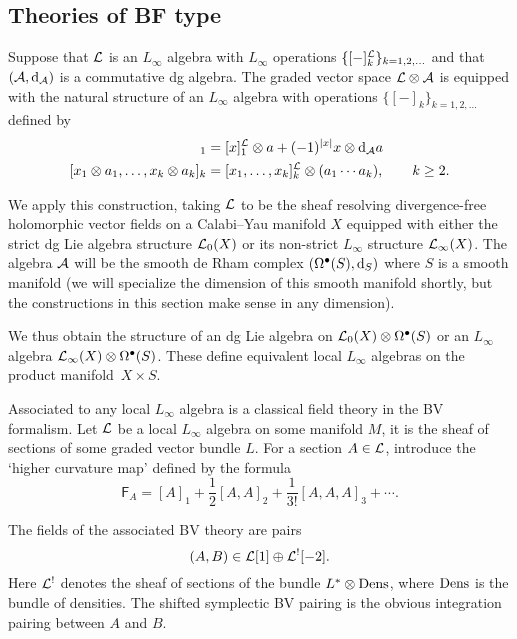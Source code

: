 

\subsection{Theories of BF type}

\parsec
Suppose that $\mathcal L$ is an $L_\infty$ algebra with $L_\infty$ operations $\{[-]^\mathcal L_k\}_{k=1,2,\ldots}$ and that $(\mathcal A, {\rm d}_\mathcal A)$ is a commutative dg algebra. 
The graded vector space $\mathcal L \otimes \mathcal A$ is equipped with the natural structure of an $L_\infty$ algebra with operations $\{[-]_k\}_{k=1,2,\ldots}$ defined by
\begin{align*}
[x \otimes a]_1 & = [x]^\cL_1 \otimes a + (-1)^{|x|} x \otimes \d_\cA a \\
[x_1 \otimes a_1, \ldots , x_k \otimes a_k]_k & = [x_1,\ldots,x_k]^\cL_k \otimes (a_1 \cdots a_k), \qquad k \geq 2 .
\end{align*}

We apply this construction, taking $\mathcal L$ to be the sheaf resolving divergence-free holomorphic vector fields on a Calabi--Yau manifold $X$ equipped with either the strict dg Lie algebra structure $\mathcal L_0(X)$ or its non-strict $L_\infty$ structure $\mathcal L_\infty (X)$. 
The algebra $\mathcal A$ will be the smooth de Rham complex $(\Omega^\bullet(S) , {\rm d}_S)$ where $S$ is a smooth manifold (we will specialize the dimension of this smooth manifold shortly, but the constructions in this section make sense in any dimension). 

We thus obtain the structure of an dg Lie algebra on $\mathcal L_0(X) \otimes \Omega^{\bullet}(S)$ or an $L_\infty$ algebra $\mathcal L_\infty(X) \otimes \Omega^\bullet(S)$.
These define equivalent local $L_\infty$ algebras on the product manifold~$X \times S$. 

\parsec[s:bf]

Associated to any local $L_\infty$ algebra is a classical field theory in the BV formalism.
Let $\mathcal L$ be a local $L_\infty$ algebra on some manifold $M$, it is the sheaf of sections of some graded vector bundle $L$. 
For a section $A \in \mathcal L$, introduce the `higher curvature map' defined by the formula
\[
\mathsf{F}_A = [A]_1 + \frac12 [A,A]_2 + \frac{1}{3!} [A,A,A]_3 + \cdots .
\]

The fields of the associated BV theory are pairs
\[
  (A, B) \in \mathcal L[1] \oplus \mathcal L^{!}[-2] .
\]
Here $\mathcal L^!$ denotes the sheaf of sections of the bundle $L^* \otimes {\rm Dens}$, where ${\rm Dens}$ is the bundle of densities. 
The shifted symplectic BV pairing is the obvious integration pairing between $A$ and $B$. 

